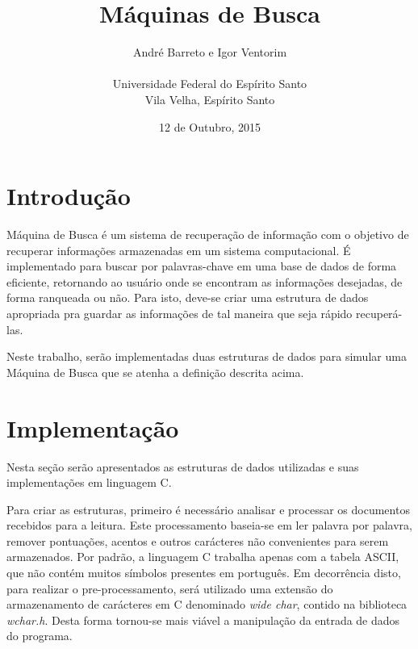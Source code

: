 \documentclass[
	11pt,				%
	oneside,			%
	a4paper,			%
	english,			%
	brazil,				%
	]{article}
\title{\textbf{Máquinas de Busca}}
\author{
André Barreto e Igor Ventorim\\\\
\normalsize Universidade Federal do Espírito Santo\\
\normalsize Vila Velha, Espírito Santo
}
\date{12 de Outubro, 2015}
\begin{document}

\frenchspacing


\maketitle



\section*{Introdução}
Máquina de Busca é um sistema de recuperação de informação com o objetivo de recuperar informações armazenadas em um sistema computacional. É implementado para buscar por palavras-chave em uma base de dados de forma eficiente, retornando ao usuário onde se encontram as informações desejadas, de forma ranqueada ou não. Para isto, deve-se criar uma estrutura de dados apropriada pra guardar as informações de tal maneira que seja rápido recuperá-las. \cite{search}

Neste trabalho, serão implementadas duas estruturas de dados para simular uma Máquina de Busca que se atenha a definição descrita acima.

\section{Implementação}
Nesta seção serão apresentados as estruturas de dados utilizadas e suas implementações em linguagem C.

Para criar as estruturas, primeiro é necessário analisar e processar os documentos recebidos para a leitura. Este processamento baseia-se em ler palavra por palavra, remover pontuações, acentos e outros carácteres não convenientes para serem armazenados. Por padrão, a linguagem C trabalha apenas com a tabela ASCII, que não contém muitos símbolos presentes em português. Em decorrência disto, para realizar o pre-processamento, será utilizado uma extensão do armazenamento de carácteres em C denominado \textit{wide char}, contido na biblioteca \textit{wchar.h}. \cite{wchar} Desta forma tornou-se mais viável a manipulação da entrada de dados do programa.
\end{document}
